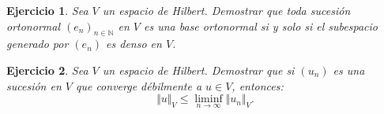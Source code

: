 \documentclass[11pt]{report}
\newtheorem{ex}{Ejercicio}
\newenvironment{solution}{\begin{proof}[Solución]}{\end{proof}}
\newcommand{\inner}[2]{( #1, #2 )_V}
\newcommand{\norma}[1]{\Vert #1 \Vert_V}
\begin{document}

\begin{ex}
Sea $V$ un espacio de Hilbert. Demostrar que toda sucesión ortonormal $(e_n)_{n \in \mathbb{N}}$ en $V$ es una base ortonormal si y solo si el subespacio generado por $(e_n)$ es denso en $V$.
\end{ex}






\begin{ex}
Sea $V$ un espacio de Hilbert. Demostrar que si $(u_n)$ es una sucesión en $V$ que converge débilmente a $u \in V$, entonces:
\begin{equation*}
\norma{u} \leq \liminf_{n \to \infty} \norma{u_n}.
\end{equation*}
\end{ex}
\end{document}
